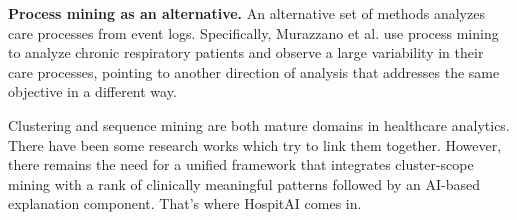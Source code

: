 \textbf{Process mining as an alternative.} An alternative set of methods analyzes care processes from event logs. Specifically, Murazzano et al. \cite{murazzano2026} use process mining to analyze chronic respiratory patients and observe a large variability in their care processes, pointing to another direction of analysis that addresses the same objective in a different way.

Clustering and sequence mining are both mature domains in healthcare analytics. There have been some research works which try to link them together. However, there remains the need for a unified framework that integrates cluster-scope mining with a rank of clinically meaningful patterns followed by an AI-based explanation component. That's where HospitAI comes in.